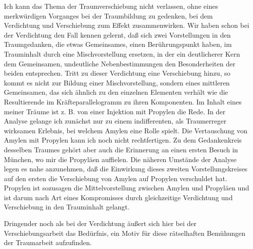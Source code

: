 \documentclass[twoside=true,titlepage=false,open=any, parskip=never, fontsize=10pt, headings=small, chapterprefix=false, appendixprefix=false]{scrbook}
\begin{document}
            
        \pstart
        Ich kann das Thema der Traumverschiebung nicht verlassen, ohne eines
               merkwürdigen Vorganges bei der Traumbildung zu gedenken, bei dem Verdichtung und
               Verschiebung zum Effekt zusammenwirken. Wir haben schon bei der Verdichtung
               den Fall kennen gelernt, daß sich zwei Vorstellungen in den Traumgedanken, die etwas Gemeinsames, einen Berührungspunkt haben, im Trauminhalt
               durch eine Mischvorstellung ersetzen, in der ein deutlicherer Kern dem
               Gemeinsamen, undeutliche Nebenbestimmungen den Besonderheiten der
               beiden entsprechen. Tritt zu dieser Verdichtung eine Verschiebung hinzu, so
               kommt es nicht zur Bildung einer Mischvorstellung, sondern eines mittleren Gemeinsamen, das sich ähnlich zu den
               einzelnen Elementen verhält wie die Resultierende im Kräfteparallelogramm zu
               ihren Komponenten. Im Inhalt eines meiner Träume ist z. B. von einer
               Injektion mit Propylen die Rede. In der Analyse
               gelange ich zunächst nur zu einem indifferenten, als Traumerreger wirksamen Erlebnis, bei welchem Amylen
               eine Rolle spielt. Die Vertauschung von Amylen mit Propylen kann ich noch
               nicht rechtfertigen. Zu dem Gedankenkreis desselben Traumes gehört aber
               auch die Erinnerung an einen ersten Besuch in München, wo mir die Propyläen auffielen. Die näheren Umstände der
               Analyse legen es nahe anzunehmen, daß die Einwirkung dieses zweiten
               Vorstellungskreises auf den ersten die Verschiebung von Amylen auf Propylen
               verschuldet hat. Propylen ist sozusagen die
               Mittelvorstellung zwischen Amylen und Propyläen und ist darum nach Art eines Kompromisses durch gleichzeitige Verdichtung und
               Verschiebung in den Trauminhalt gelangt.
        \pend
    
         
            
            
            
        \pstart
        Dringender noch als bei der Verdichtung äußert sich hier bei der
               Verschiebungsarbeit das Bedürfnis, ein Motiv für diese rätselhaften
               Bemühungen der Traumarbeit aufzufinden.
        \pend
    
         
            
            
            \pstart{}\pend
            
\end{document}

